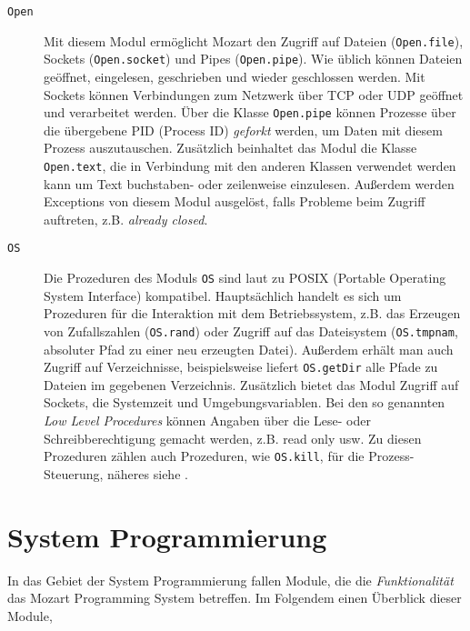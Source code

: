 \begin{description}
  \item[\texttt{Open}] Mit diesem Modul ermöglicht Mozart den Zugriff auf
  Dateien (\texttt{Open.file}), Sockets (\texttt{Open.socket}) und Pipes
  (\texttt{Open.pipe}). Wie üblich können Dateien geöffnet, eingelesen,
  geschrieben und wieder geschlossen werden. Mit Sockets können Verbindungen zum
  Netzwerk über TCP oder UDP geöffnet und verarbeitet werden. Über die Klasse
  \texttt{Open.pipe} können Prozesse über die übergebene PID (Process ID)
  \textsl{geforkt} werden, um Daten mit diesem Prozess auszutauschen.
  Zusätzlich beinhaltet das Modul die Klasse \texttt{Open.text}, die in
  Verbindung mit den anderen Klassen verwendet werden kann um Text buchstaben-
  oder zeilenweise einzulesen. Außerdem werden Exceptions von diesem Modul
  ausgelöst, falls Probleme beim Zugriff auftreten, z.B. \textsl{already closed}.
  
  \item[\texttt{OS}] Die Prozeduren des Moduls \texttt{OS} sind laut
  \cite[System Modules, Part IV]{url:mozart-documentation} zu POSIX (Portable
  Operating System Interface)
  kompatibel. Hauptsächlich handelt es sich um Prozeduren für die Interaktion
  mit dem Betriebssystem, z.B. das Erzeugen von Zufallszahlen (\texttt{OS.rand})
  oder Zugriff auf das Dateisystem (\texttt{OS.tmpnam}, absoluter Pfad zu einer
  neu erzeugten Datei). Außerdem erhält man auch Zugriff auf Verzeichnisse,
  beispielsweise liefert \texttt{OS.getDir} alle Pfade zu Dateien im gegebenen
  Verzeichnis. Zusätzlich bietet das Modul Zugriff auf Sockets, die Systemzeit und
  Umgebungsvariablen. Bei den so genannten \textsl{Low Level Procedures} können
  Angaben über die Lese- oder Schreibberechtigung gemacht werden, z.B. read only
  usw. Zu diesen Prozeduren zählen auch Prozeduren, wie \texttt{OS.kill}, für
  die Prozess-Steuerung, näheres siehe \cite[System Modules, Part IV]{url:mozart-documentation}.
\end{description}

\section{System Programmierung}

In das Gebiet der System Programmierung fallen Module, die die
\textsl{Funktionalität} das Mozart Programming System betreffen. Im Folgendem
einen Überblick dieser Module,

